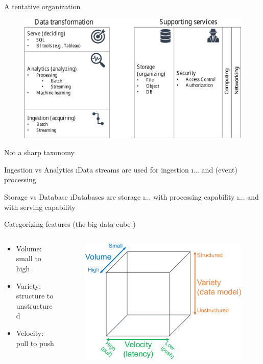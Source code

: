 \begin{frame}[allowframebreaks]{A tentative organization}
\begin{figure}
\centering
\includegraphics[height=.7\textheight]{imgs/cloudpatchwork.pdf}
\end{figure}

\framebreak

Not a sharp taxonomy

Ingestion vs Analytics
\i Data streams are used for ingestion
\i ... and (event) processing

Storage vs Database 
\i Databases are storage
\i ... with processing capability
\i ... and with serving capability

\framebreak

Categorizing features (the big-data cube \cite{meijer2012your})
\begin{columns}
\begin{column}{0.5\textwidth}
\begin{itemize}
\item Volume: small to high
\item Variety: structure to unstructured
\item Velocity: pull to push
\end{itemize}
\end{column}
\begin{column}{0.5\textwidth}
\begin{figure}
\centering
\includegraphics[scale=.4]{imgs/bigdatacube.pdf}
\end{figure}
\end{column}
\end{columns}


\end{frame}
